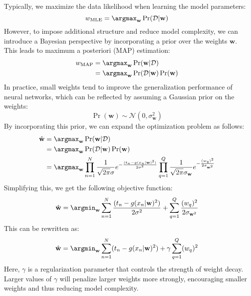 Typically, we maximize the data likelihood when learning the model parameters:
\[w_{\text{MLE}}=\argmax_{\mathbf{w}}\Pr(\mathcal{D}|\mathbf{w})\]
However, to impose additional structure and reduce model complexity, we can introduce a Bayesian perspective by incorporating a prior over the weights $\mathbf{w}$. 
This leads to maximum a posteriori (MAP) estimation:
\begin{align*}
    w_{\text{MAP}}  &=\argmax_{\mathbf{w}}\Pr(\mathbf{w}|\mathcal{D}) \\
                    &=\argmax_{\mathbf{w}}\Pr(\mathcal{D}|\mathbf{w})\Pr(\mathbf{w})
\end{align*}
In practice, small weights tend to improve the generalization performance of neural networks, which can be reflected by assuming a Gaussian prior on the weights:
\[\Pr(\mathbf{w})\sim\mathcal{N}(0,\sigma_{\mathbf{w}}^2)\]
By incorporating this prior, we can expand the optimization problem as follows:
\begin{align*}
    \hat{\mathbf{w}}    &=\argmax_{\mathbf{w}}\Pr(\mathbf{w}|\mathcal{D}) \\
                        &=\argmax_{\mathbf{w}}\Pr(\mathcal{D}|\mathbf{w})\Pr(\mathbf{w}) \\
                        &=\argmax_{\mathbf{w}}\prod_{n=1}^N\dfrac{1}{\sqrt{2\pi}\sigma}e^{-\frac{(t_n-g(x_n|\mathbf{w})^2)}{2\sigma^2}}\prod_{q=1}^Q\dfrac{1}{\sqrt{2\pi}\sigma_\mathbf{w}}e^{-\frac{(w_q)^2}{2\sigma_{\mathbf{w}^2}}}
\end{align*}
Simplifying this, we get the following objective function:
\[\hat{\mathbf{w}}=\argmin_{\mathbf{w}}\sum_{n=1}^N\dfrac{(t_n-g(x_n|\mathbf{w})^2)}{2\sigma^2}+\sum_{q=1}^Q\dfrac{(w_q)^2}{2\sigma_{\mathbf{w}^2}}\]
This can be rewritten as:
\[\hat{\mathbf{w}}=\argmin_{\mathbf{w}}\sum_{n=1}^N(t_n-g(x_n|\mathbf{w})^2)+\gamma\sum_{q=1}^Q(w_q)^2\]
Here, $\gamma$ is a regularization parameter that controls the strength of weight decay. 
Larger values of $\gamma$ will penalize larger weights more strongly, encouraging smaller weights and thus reducing model complexity.

